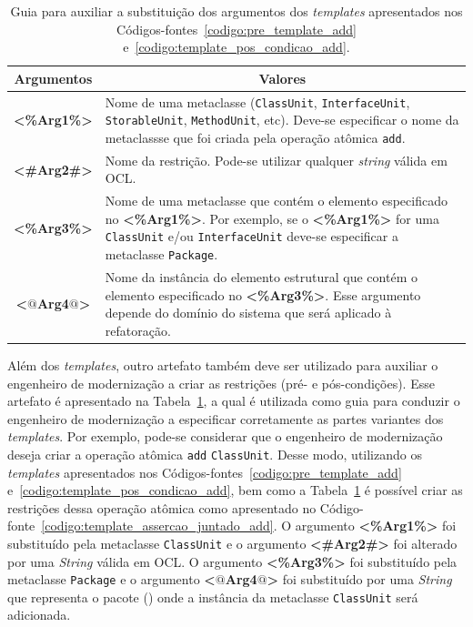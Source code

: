 \begin{table}[h]
\centering
\caption{Guia para auxiliar a substituição dos argumentos dos \textit{templates} apresentados nos Códigos-fontes~\ref{codigo:pre_template_add} e~\ref{codigo:template_pos_condicao_add}.}
\label{tab:guia_template_pre_pos_add}
\begin{tabular}{ | m{1.7cm} | m{12cm}| } 
\hline
\multicolumn{1}{|c|}{Argumentos}                                         & \multicolumn{1}{c|}{Valores} \\ \hline
\multicolumn{1}{|c|}{\textbf{<\%Arg1\%>}} & Nome de uma metaclasse (\texttt{ClassUnit}, \texttt{InterfaceUnit}, \texttt{StorableUnit}, \texttt{MethodUnit}, etc). Deve-se especificar o nome da metaclassse que foi criada pela operação atômica \texttt{add}. \\ 
\hline
\multicolumn{1}{|c|}{\textbf{<\#Arg2\#>}} & Nome da restrição. Pode-se utilizar qualquer \textit{string} válida em OCL. \\ 
\hline
\multicolumn{1}{|c|}{\textbf{<\%Arg3\%>}} & Nome de uma metaclasse que contém o elemento especificado no \textbf{<\%Arg1\%>}. Por exemplo, se o \textbf{<\%Arg1\%>} for uma \texttt{ClassUnit} e/ou \texttt{InterfaceUnit} deve-se especificar a metaclasse \texttt{Package}. \\ 
\hline
\multicolumn{1}{|c|}{\textbf{<$@$Arg4$@$>}} & Nome da instância do elemento estrutural que contém o elemento especificado no \textbf{<\%Arg3\%>}. Esse argumento depende do domínio do sistema que será aplicado à refatoração. \\ 
\hline
\end{tabular}
\end{table}

Além dos \textit{templates}, outro artefato também deve ser utilizado para auxiliar o engenheiro de modernização a criar as restrições (pré- e pós-condições). Esse artefato é apresentado na Tabela~\ref{tab:guia_template_pre_pos_add}, a qual é utilizada como guia para conduzir o engenheiro de modernização a especificar corretamente as partes variantes dos \textit{templates}. Por exemplo, pode-se considerar que o engenheiro de modernização deseja criar a operação atômica \texttt{add} \texttt{ClassUnit}. Desse modo, utilizando os \textit{templates} apresentados nos Códigos-fontes~\ref{codigo:pre_template_add} e~\ref{codigo:template_pos_condicao_add}, bem como a Tabela~\ref{tab:guia_template_pre_pos_add} é possível criar as restrições dessa operação atômica como apresentado no Código-fonte~\ref{codigo:template_assercao_juntado_add}. O argumento \textbf{<\%Arg1\%>} foi substituído pela metaclasse \texttt{ClassUnit} e o argumento \textbf{<\#Arg2\#>} foi alterado por uma \textit{String} válida em OCL. O argumento \textbf{<\%Arg3\%>} foi substituído pela metaclasse \texttt{Package} e o  argumento \textbf{<$@$Arg4$@$>} foi  substituído por uma \textit{String} que representa o pacote () onde a instância da metaclasse \texttt{ClassUnit} será adicionada.

